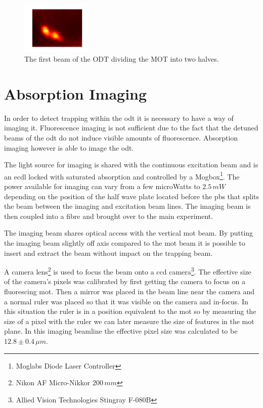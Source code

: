 \begin{figure}[h]
\centering
\includegraphics[width=0.3\textwidth]{figs/mot_slice.pdf}
\caption{The first beam of the ODT dividing the MOT into two halves.}
\label{fig:mot_slice}
\end{figure}

\section{Absorption Imaging}

In order to detect trapping within the \gls{odt} it is necessary to have a way of imaging it. Fluorescence imaging is not sufficient due to the fact that the detuned beams of the \gls{odt} do not induce visible amounts of fluorescence. Absorption imaging however is able to image the \gls{odt}.

The light source for imaging is shared with the continuous excitation beam and is an \gls{ecdl} locked with saturated absorption and controlled by a Mogbox\footnote{Moglabs Diode Laser Controller}. The power available for imaging can vary from a few microWatts to $2.5\,\unit{mW}$ depending on the position of the half wave plate located before the \gls{pbs} that splits the beam between the imaging and excitation beam lines. The imaging beam is then coupled into a fibre and brought over to the main experiment.

The imaging beam shares optical access with the vertical \gls{mot} beam. By putting the imaging beam slightly off axis compared to the \gls{mot} beam it is possible to insert and extract the beam without impact on the trapping beam.

A camera lens\footnote{Nikon AF Micro-Nikkor $200\,\unit{mm}$} is used to focus the beam onto a \gls{ccd} camera\footnote{Allied Vision Technologies Stingray F-080B}. The effective size of the camera's pixels was calibrated by first getting the camera to focus on a fluorescing \gls{mot}. Then a mirror was placed in the beam line near the camera and a normal ruler was placed so that it was visible on the camera and in-focus. In this situation the ruler is in a position equivalent to the \gls{mot} so by measuring the size of a pixel with the ruler we can later measure the size of features in the \gls{mot} plane. In this imaging beamline the effective pixel size was calculated to be $12.8\pm0.4\,\unit{\mu m}$.

